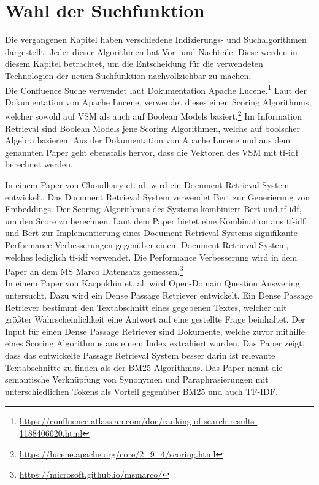 \section{Wahl der Suchfunktion}
Die vergangenen Kapitel haben verschiedene Indizierungs- und Suchalgorithmen dargestellt.
Jeder dieser Algorithmen hat Vor- und Nachteile.
Diese werden in diesem Kapitel betrachtet, um die Entscheidung für die verwendeten Technologien der neuen Suchfunktion nachvollziehbar zu machen.\\

Die Confluence Suche verwendet laut Dokumentation Apache Lucene.\footnote{\url{https://confluence.atlassian.com/doc/ranking-of-search-results-1188406620.html}}
Laut der Dokumentation von Apache Lucene, verwendet dieses einen Scoring Algorithmus, welcher sowohl auf VSM als auch auf Boolean Models basiert.\footnote{\url{https://lucene.apache.org/core/2_9_4/scoring.html}}
Im Information Retrieval sind Boolean Models jene Scoring Algorithmen, welche auf boolscher Algebra basieren.
Aus der Dokumentation von Apache Lucene und aus dem genannten Paper geht ebensfalls hervor, dass die Vektoren des VSM mit tf-idf berechnet werden.

In einem Paper von Choudhary et. al. wird ein Document Retrieval System entwickelt.\cite{Choudhary_Guttikonda_Chowdhury_Learmonth_2020}
Das Document Retrieval System verwendet Bert zur Generierung von Embeddings.
Der Scoring Algorithmus des Systems kombiniert Bert und tf-idf, um den Score zu berechnen.
Laut dem Paper bietet eine Kombination aus tf-idf und Bert zur Implementierung eines Document Retrieval Systems signifikante Performance Verbesserungen gegenüber einem Document Retrieval System, welches lediglich tf-idf verwendet.
Die Performance Verbesserung wird in dem Paper an dem MS Marco Datensatz gemessen.\footnote{\url{https://microsoft.github.io/msmarco/}}\\

In einem Paper von Karpukhin et. al. wird Open-Domain Question Answering untersucht.\cite{Karpukhin_Oguz_Min_Lewis_Wu_Edunov_Chen_Yih_2020}
Dazu wird ein Dense Passage Retriever entwickelt.
Ein Dense Passage Retriever bestimmt den Textabschnitt eines gegebenen Textes, welcher mit größter Wahrscheinlichkeit eine Antwort auf eine gestellte Frage beinhaltet.
Der Input für einen Dense Passage Retriever sind Dokumente, welche zuvor mithilfe eines Scoring Algorithmus aus einem Index extrahiert wurden.
Das Paper zeigt, dass das entwickelte Passage Retrieval System besser darin ist relevante Textabschnitte zu finden als der BM25 Algorithmus. 
Das Paper nennt die semantische Verknüpfung von Synonymen und Paraphrasierungen mit unterschiedlichen Tokens als Vorteil gegenüber BM25 und auch TF-IDF.

